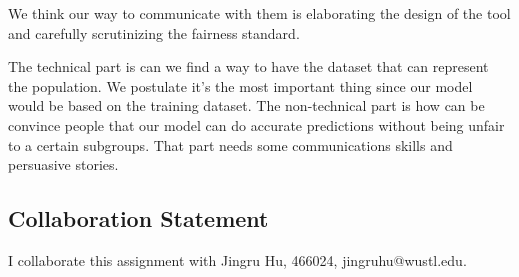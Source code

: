 \documentclass[11pt]{article}
\begin{document}
\begin{enumerate}
We think our way to communicate with them is elaborating the design of the tool and carefully scrutinizing the fairness standard. 

The technical part is can we find a way to have the dataset that can represent the population. We postulate it's the most important thing since our model would be based on the training dataset. The non-technical part is how can be convince people that our model can do accurate predictions without being unfair to a certain subgroups. That part needs some communications skills and persuasive stories.


\end{enumerate}
\pagebreak


\subsection*{Collaboration Statement}

I collaborate this assignment with Jingru Hu, 466024, jingruhu@wustl.edu.
\end{document}
